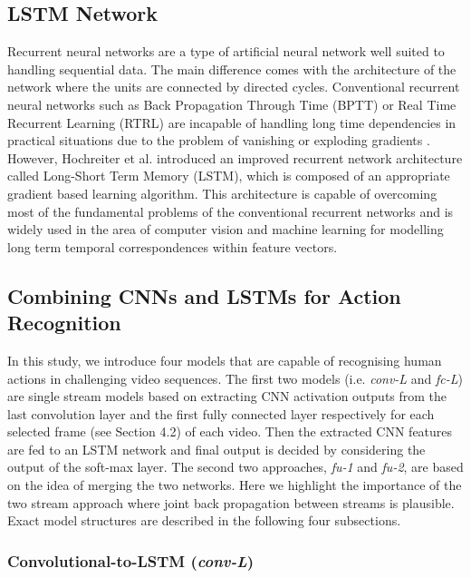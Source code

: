 \documentclass[10pt,twocolumn,letterpaper]{article}
\begin{document}
\subsection{LSTM Network}

Recurrent neural networks are a type of artificial neural network well suited to handling sequential data. The main difference comes with the architecture of the network where the units are connected by directed cycles. Conventional recurrent neural networks such as Back Propagation Through Time (BPTT) \cite{BPTT1992} or Real Time Recurrent Learning (RTRL) \cite{RNN1989} are incapable of handling long time dependencies in practical situations due to the problem of vanishing or exploding gradients \cite{vanishGrad1994}. However, Hochreiter et al.\cite{LSTM1997} introduced an improved recurrent network architecture called Long-Short Term Memory (LSTM), which is composed of an appropriate gradient based learning algorithm. This architecture is capable of overcoming most of the fundamental problems of the conventional recurrent networks and is widely used in the area of computer vision and machine learning for modelling long term temporal correspondences within feature vectors.%

\subsection{Combining CNNs and LSTMs for Action Recognition}

 In this study, we introduce four models that are capable of recognising human actions in challenging video sequences. The first two models (i.e. \textit{conv-L} and \textit{fc-L}) are single stream models based on extracting CNN activation outputs from the last convolution layer and the first fully connected layer respectively for each selected frame (see Section 4.2) of each video. Then the extracted CNN features are fed to an LSTM network and final output is decided by considering the  output of the soft-max layer. The second two approaches, \textit{fu-1} and \textit{fu-2}, are based on the idea of merging the two networks. Here we highlight the importance of the two stream approach where joint back propagation between streams is plausible. Exact model structures are described in the following four subsections.   
 
  
\subsubsection{Convolutional-to-LSTM (\textit{conv-L})}
 
\end{document}
